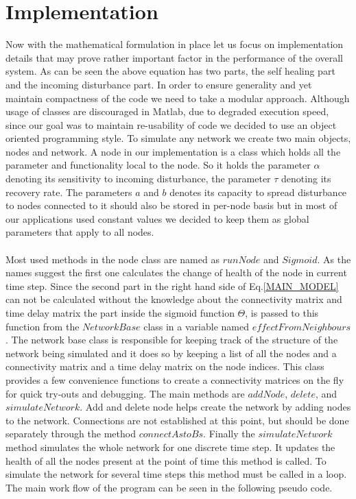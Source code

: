 \documentclass[11pt]{article}
\begin{document}
\section{Implementation}
Now with the mathematical formulation in place let us focus on implementation details that may prove rather important factor in the performance of the overall system. As can be seen the above equation has two parts, the self healing part and the incoming disturbance part. In order to ensure generality and yet maintain compactness of the code we need to take a modular approach. Although usage of classes are discouraged in Matlab, due to degraded execution speed, since our goal was to maintain re-usability of code we decided to use an object oriented programming style. To simulate any network we create two main objects, nodes and network. A node in our implementation is a class which holds all the parameter and functionality local to the node. So it holds the parameter $\alpha$ denoting its sensitivity to incoming disturbance, the parameter $\tau$ denoting its recovery rate. The parameters $a$ and $b$ denotes its capacity to spread disturbance to nodes connected to it should also be stored in per-node basis but in most of our applications used constant values we decided to keep them as global parameters that apply to all nodes.\\
\\ 
Most used methods in the node class are named as $runNode$ and $Sigmoid$. As the names suggest the first one calculates the change of health of the node in current time step. Since the second part in the right hand side of Eq.\ref{MAIN_MODEL} can not be calculated without the knowledge about the connectivity matrix and time delay matrix the part inside the sigmoid function $\Theta$, is passed to this function from the $NetworkBase$ class in a variable named $effectFromNeighbours$. The network base class is responsible for keeping track of the structure of the network being simulated and it does so by keeping a list of all the nodes and a connectivity matrix and a time delay matrix on the node indices. This class provides a few convenience functions to create a connectivity matrices on the fly for quick try-outs and debugging. The main methods are $addNode$, $delete$, and $simulateNetwork$. Add and delete node helps create the network by adding nodes to the network. Connections are not established at this point, but should be done separately through the method $connectAstoBs$. Finally the $simulateNetwork$ method simulates the whole network for one discrete time step. It updates the health of all the nodes present at the point of time this method is called. To simulate the network for several time steps this method must be called in a loop. The main work flow of the program can be seen in the following pseudo code.
\end{document}
